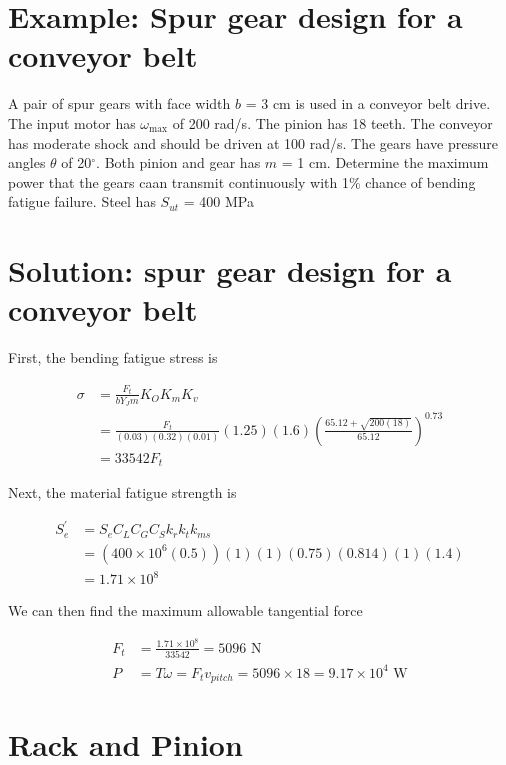 \documentclass[a4paper,openany]{tufte-book}
\begin{document}
\section{Example: Spur gear design for a conveyor belt}
\label{sec:org5817b57}

A pair of spur gears with face width \(b\) = 3 cm is used in a conveyor belt drive. The input motor has \(\omega_{\max}\) of 200 rad/s. The pinion has 18 teeth. The conveyor has moderate shock and should be driven at 100 rad/s. The gears have pressure angles \(\theta\) of 20\(^{\circ}\). Both pinion and gear has \(m\) = 1 cm. Determine the maximum power that the gears caan transmit continuously with 1\% chance of bending fatigue failure. Steel has \(S_{ut}\) = 400 MPa

\section{Solution: spur gear design for a conveyor belt}
\label{sec:orgf97154f}

First, the bending fatigue stress is

\begin{align*}
  \sigma &= \frac{F_{t}}{bY_{J}m} K_{O}K_{m}K_{v} \\
         &= \frac{F_{t}}{(0.03)(0.32)(0.01)} (1.25)(1.6) \left( \frac{65.12 + \sqrt{200(18)}}{65.12} \right)^{0.73} \\
         &= 33542 F_{t}
\end{align*}

Next, the material fatigue strength is

\begin{align*}
  S_{e}^{\prime} &= S_{e}C_{L}C_{G}C_{S}k_{r}k_{t}k_{ms} \\
                 &= (400 \times 10^{6}(0.5))(1)(1)(0.75)(0.814)(1)(1.4) \\
                 &= 1.71 \times 10^{8}
  \end{align*}

We can then find the maximum allowable tangential force

\begin{align*}
  F_{t} &= \frac{1.71 \times 10^{8}}{33542} = 5096 \text{ N} \\
  P &= T \omega = F_{t} v_{pitch} = 5096 \times 18 = 9.17 \times 10^{4} \text{ W}
\end{align*}

\section{Rack and Pinion}
\label{sec:orgbe96d87}
\end{document}
